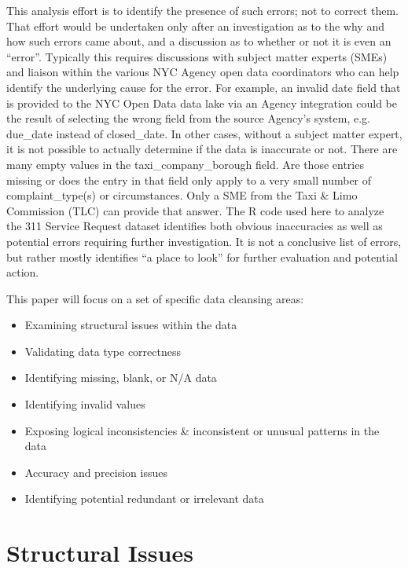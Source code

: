 \documentclass[12pt, titlepage]{article}
\begin{document}
This analysis effort is to identify the presence of such errors; not to correct them. That effort would be undertaken only after an investigation as to the why
and how such errors came about, and a discussion as to whether or not it is even an ``error''. Typically this requires discussions with subject matter experts (SMEs)
 and liaison within the various NYC Agency open data coordinators who can help identify the underlying cause for the error.
 For example, an invalid date field that is provided to the NYC Open Data data lake via an Agency integration could
be the result of selecting the wrong field from the source Agency's system, e.g. due\_date instead of closed\_date. In other cases, without a subject matter
expert, it is not possible to actually determine if the data is inaccurate or not. There are many empty values in the taxi\_company\_borough field. Are those
entries missing or does the entry in that field only apply to a very small number of complaint\_type(s) or circumstances. Only a SME
from the Taxi \& Limo Commission (TLC) can provide that answer. The R code used here to analyze the 311 Service Request dataset identifies
both obvious inaccuracies as well as potential errors requiring further investigation. It is not a conclusive list of errors, but rather mostly identifies
``a place to look'' for further evaluation and potential action.

This paper will focus on a set of specific data cleansing areas:

\begin{itemize}
	\item Examining structural issues within the data
	\item Validating data type correctness
	\item Identifying missing, blank, or N/A data
	\item Identifying invalid values
	\item Exposing logical inconsistencies \& inconsistent or unusual patterns in the data
	\item Accuracy and precision issues
	\item Identifying potential redundant or irrelevant data  
\end{itemize}



\section{Structural Issues}\label{sec:structural}
\end{document}
